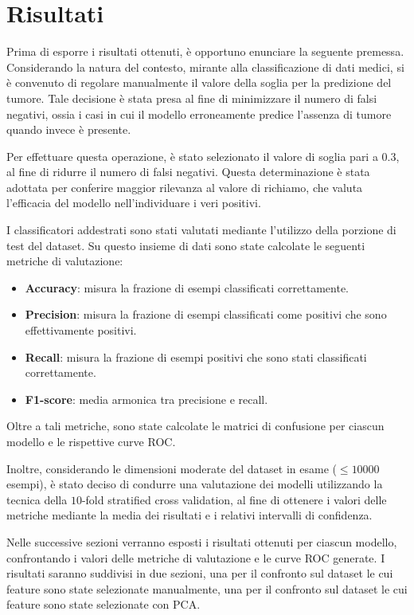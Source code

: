 \chapter{Risultati} \label{chp:risultati}
Prima di esporre i risultati ottenuti, è opportuno enunciare la seguente premessa.
Considerando la natura del contesto, mirante alla classificazione di dati medici,
si è convenuto di regolare manualmente il valore della soglia per la predizione
del tumore. Tale decisione è stata presa al fine di minimizzare il numero di
falsi negativi, ossia i casi in cui il modello erroneamente predice l'assenza di
tumore quando invece è presente.

Per effettuare questa operazione, è stato selezionato il valore di soglia pari a
$0.3$, al fine di ridurre il numero di falsi negativi. Questa determinazione è
stata adottata per conferire maggior rilevanza al valore di richiamo, che valuta
l'efficacia del modello nell'individuare i veri positivi.

I classificatori addestrati sono stati valutati mediante l'utilizzo della
porzione di test del dataset. Su questo insieme di dati sono state calcolate le
seguenti metriche di valutazione:

\begin{itemize}
    \item \textbf{Accuracy}: misura la frazione di esempi classificati correttamente.
    \item \textbf{Precision}: misura la frazione di esempi classificati come
          positivi che sono effettivamente positivi.
    \item \textbf{Recall}: misura la frazione di esempi positivi che sono stati
          classificati correttamente.
    \item \textbf{F1-score}: media armonica tra precisione e recall.
\end{itemize}

Oltre a tali metriche, sono state calcolate le matrici di confusione per ciascun
modello e le rispettive curve ROC.

Inoltre, considerando le dimensioni moderate del dataset in esame ($\leq 10000$
esempi), è stato deciso di condurre una valutazione dei modelli utilizzando la
tecnica della $10$-fold stratified cross validation, al fine di ottenere i
valori delle metriche mediante la media dei risultati e i relativi intervalli di
confidenza.

Nelle successive sezioni verranno esposti i risultati ottenuti per ciascun
modello, confrontando i valori delle metriche di valutazione e le curve ROC
generate. I risultati saranno suddivisi in due sezioni, una per il confronto
sul dataset le cui feature sono state selezionate manualmente, una per il
confronto sul dataset le cui feature sono state selezionate con PCA.
